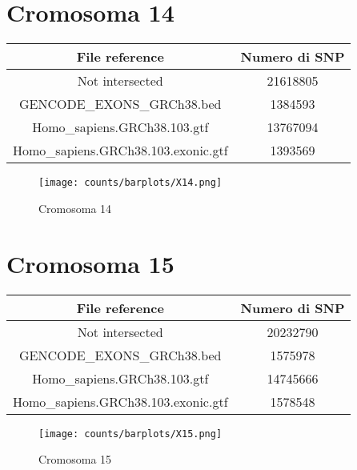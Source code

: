 \section*{Cromosoma 14}
  \begin{table}[H]\centering
	\begin{tabular}{|c|c|}
	  \hline
	  File reference & Numero di SNP \\
		\hline
		Not intersected & 21618805 \\
	  \hline
	  GENCODE\_EXONS\_GRCh38.bed & 1384593 \\
	  \hline
	  Homo\_sapiens.GRCh38.103.gtf & 13767094 \\
	  \hline
	  Homo\_sapiens.GRCh38.103.exonic.gtf & 1393569 \\
	  \hline
	\end{tabular}
  \end{table}
  \begin{figure}[H]
	\texttt{[image: counts/barplots/X14.png]}
	\caption{Cromosoma 14}
	\label{fig:chr14}
  \end{figure}

\section*{Cromosoma 15}
  \begin{table}[H]\centering
	\begin{tabular}{|c|c|}
	  \hline
	  File reference & Numero di SNP \\
		\hline
		Not intersected & 20232790 \\
	  \hline
	  GENCODE\_EXONS\_GRCh38.bed &1575978 \\
	  \hline
	  Homo\_sapiens.GRCh38.103.gtf & 14745666 \\
	  \hline
	  Homo\_sapiens.GRCh38.103.exonic.gtf & 1578548 \\
	  \hline
	\end{tabular}
  \end{table}
  \begin{figure}[H]
	\texttt{[image: counts/barplots/X15.png]}
	\caption{Cromosoma 15}
	\label{fig:chr15}
  \end{figure}

